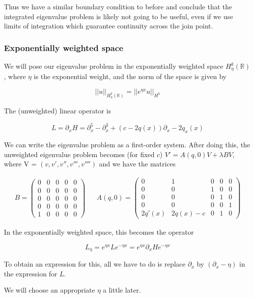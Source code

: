 \documentclass[12pt]{article}
\def\R{{\mathbb R}}
\begin{document}
Thus we have a similar boundary condition to before and conclude that the integrated eigenvalue problem is likely not going to be useful, even if we use limits of integration which guarantee continuity across the join point.

\subsubsection*{Exponentially weighted space}

We will pose our eigenvalue problem in the exponentially weighted space $H_\eta^k(\R)$, where $\eta$ is the exponential weight, and the norm of the space is given by

\[
||u||_{H_\eta^k(\R)} = ||e^{\eta x}u||_{H^k}
\]

The (unweighted) linear operator is

\[
L = \partial_x H = \partial_x^5 - \partial_x^3 + (c - 2q(x))\partial_x - 2 q_x(x)
\]

We can write the eigenvalue problem as a first-order system. After doing this, the unweighted eigenvalue problem becomes (for fixed $c$) $V' = A(q, 0)V + \lambda B V$, where V = $(v, v', v'', v''', v'''')$ and we have the matrices

\begin{align*}
B = \begin{pmatrix}0 & 0 & 0 & 0 & 0 \\0 & 0 & 0 & 0 & 0 \\0  & 0 & 0 & 0 & 0 \\0 & 0 & 0 & 0 & 0 \\1 & 0 & 0 & 0 & 0 \end{pmatrix} && 
A(q, 0) = \begin{pmatrix}0 & 1 & 0 & 0 & 0 \\0 & 0 & 1 & 0 & 0 \\0 & 0 & 0 & 1 & 0 \\0 & 0 & 0 & 0 & 1 \\
2q'(x) & 2q(x) - c & 0 & 1 & 0 \end{pmatrix} 
\end{align*}

In the exponentially weighted space, this becomes the operator

\[
L_\eta = e^{\eta x} L e^{-\eta x} = e^{\eta x} \partial_x H e^{-\eta x}
\]

To obtain an expression for this, all we have to do is replace $\partial_x$ by $(\partial_x - \eta)$ in the expression for $L$.

We will choose an appropriate $\eta$ a little later.\\
\end{document}

